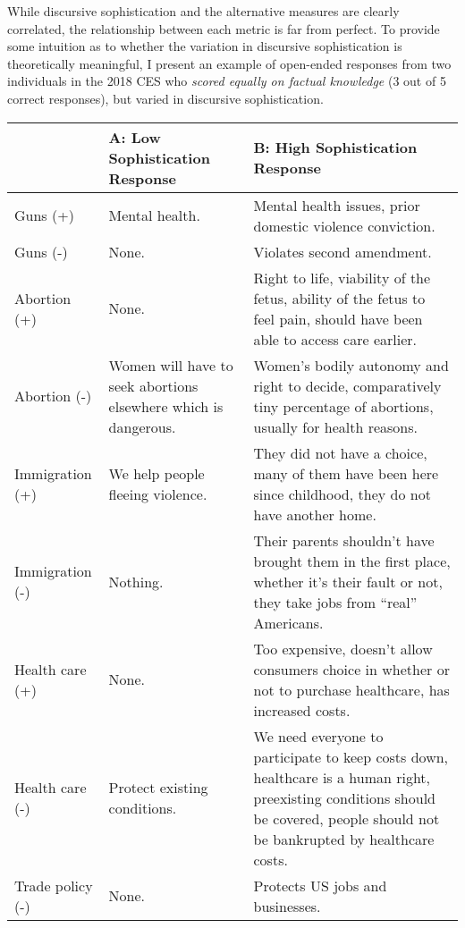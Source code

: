 While discursive sophistication and the alternative measures are clearly correlated, the relationship between each metric is far from perfect. To provide some intuition as to whether the variation in discursive sophistication is theoretically meaningful, I present an example of open-ended responses from two individuals in the 2018 CES who \textit{scored equally on factual knowledge} (3 out of 5 correct responses), but varied in discursive sophistication. 

\begin{table}[ht]\footnotesize\centering
\begin{tabular}{l|p{5.0cm}|p{7.6cm}}
\toprule
					& A: Low Sophistication Response 
					& B: High Sophistication Response
					\\\midrule
Guns (+)			& Mental health.
					& Mental health issues, prior domestic violence conviction.
					\\\hdashline
Guns (-)			& None.
					& Violates second amendment.
					\\\hdashline
Abortion (+)		& None.
					& Right to life, viability of the fetus, ability of the fetus to feel pain, should have been able to access care earlier.
					\\\hdashline
Abortion (-)		& Women will have to seek abortions elsewhere which is dangerous.
					& Women's bodily autonomy and right to decide, comparatively tiny percentage of abortions, usually for health reasons.
					\\\hdashline
Immigration (+)		& We help people fleeing violence.
					& They did not have a choice, many of them have been here since childhood, they do not have another home.
					\\\hdashline
Immigration (-)		& Nothing.
					& Their parents shouldn't have brought them in the first place, whether it’s their fault or not, they take jobs from ``real'' Americans.
					\\\hdashline
Health care (+)		& None.
					& Too expensive, doesn't allow consumers choice in whether or not to purchase healthcare, has increased costs.
					\\\hdashline
Health care (-)		& Protect existing conditions.
					& We need everyone to participate to keep costs down, healthcare is a human right, preexisting conditions should be covered, people should not be bankrupted by healthcare costs.
					\\\hdashline
Trade policy (-)	& None.
					& Protects US jobs and businesses.
					

\end{tabular}
\end{table}
